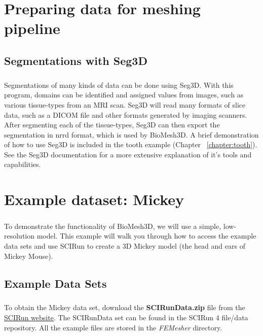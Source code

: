 \documentclass[fleqn,12pt,openany]{book}
\begin{document}
\chapter{Preparing data for meshing pipeline}
\label{chapter:prep}

\section{Segmentations with Seg3D}

\paragraph{}
Segmentations of many kinds of data can be done using Seg3D. With this program,
domains can be identified and assigned values from images, such as various 
tissue-types from an MRI scan. Seg3D will read many formats of slice data, such 
as a DICOM file and other formats generated by imaging scanners. After 
segmenting each of the tissue-types, Seg3D can then export the segmentation in 
nrrd format, which is used by BioMesh3D. A brief demonstration of how to use 
Seg3D is included in the tooth example (Chapter ~\ref{chapter:tooth}).
See the Seg3D documentation for a more extensive explanation of it's tools and capabilities.


\chapter{Example dataset: Mickey}
\label{chapter:mickey}
\paragraph{}
To demonstrate the functionality of BioMesh3D, we will use a simple, 
low-resolution model. This example will walk you through how to access the 
example data sets and use SCIRun to create a 3D Mickey model (the head and ears of Mickey Mouse).  

\section{Example Data Sets}
\paragraph{}
To obtain the Mickey data set, download the {\bf SCIRunData.zip} file from the \href{http://www.scirun.org}{SCIRun website}.
The SCIRunData set can be found in the SCIRun 4 file/data repository.
All the example files are stored in the {\em FEMesher} directory.
\end{document}
